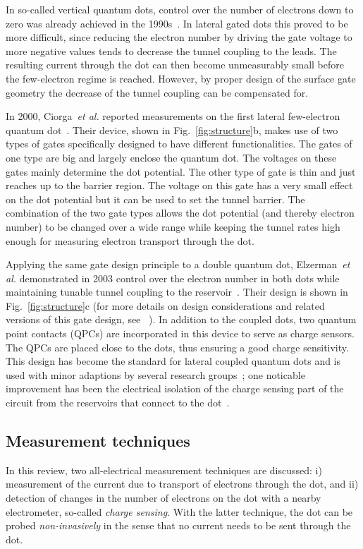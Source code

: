 \documentclass[12pt,aps,nofootinbib]{revtex4-1}
\begin{document}
In so-called vertical quantum dots, control over the number of electrons
down to zero was already achieved in the 1990s~\cite{kouwenhoven01}. In
lateral gated dots this proved to be more difficult, since
reducing the electron number by driving the gate voltage to more
negative values tends to decrease the tunnel coupling to the
leads. The resulting current through the dot can then become
unmeasurably small before the few-electron regime is reached.
However, by proper design of the surface gate geometry the
decrease of the tunnel coupling can be compensated for.

In 2000, Ciorga~\textit{et al.} reported measurements on the first
lateral few-electron quantum dot~\cite{CiorgaPRB2000}. Their
device, shown in Fig.~\ref{fig:structure}b, makes use of two types
of gates specifically designed to have different functionalities.
The gates of one type are big and largely enclose the quantum dot.
The voltages on these gates mainly determine the dot potential.
The other type of gate is thin and just reaches up to the barrier
region. The voltage on this gate has a very small effect on the
dot potential but it can be used to set the tunnel barrier. The
combination of the two gate types allows the dot potential (and
thereby electron number) to be changed over a wide range while
keeping the tunnel rates high enough for measuring electron
transport through the dot.

Applying the same gate design principle to a double quantum dot,
Elzerman~\textit{et al.} demonstrated in 2003 control over the
electron number in both dots while maintaining tunable tunnel
coupling to the reservoir~\cite{ElzermanPRB2003}. Their design is
shown in Fig.~\ref{fig:structure}c (for more details on design
considerations and related versions of this gate design, see
~\textcite{HansonThesis2005}). In addition to the coupled
dots, two quantum point contacts (QPCs) are incorporated in this
device to serve as charge sensors. The QPCs are placed close to
the dots, thus ensuring a good charge sensitivity. This design has
become the standard for lateral coupled quantum dots and is used
with minor adaptions by several research
groups~\cite{PettaPRL2004,PioroPRB2005}; one noticable improvement
has been the electrical isolation of the charge sensing part of
the circuit from the reservoirs that connect to the
dot~\cite{HansonPRL2005}.

\subsection{Measurement techniques}
In this review, two all-electrical measurement techniques are
discussed: i) measurement of the current due to transport of
electrons through the dot, and ii) detection of changes in the
number of electrons on the dot with a nearby electrometer,
so-called \textit{charge sensing}. With the latter technique, the
dot can be probed \textit{non-invasively} in the sense that no
current needs to be sent through the dot.
\end{document}
